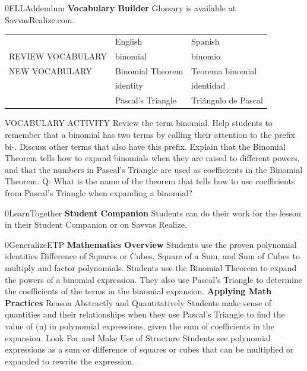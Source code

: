 \documentclass{article}
\newenvironment{te-addendum}[2]{}{}     %
\newcommand{\answer}[1]{}               %
\newcommand{\placeholder}[2]{}          %
\begin{document}
\begin{te-addendum}{0}{ELLAddendum}
\textbf{Vocabulary Builder}
Glossary is available at SavvasRealize.com.
\begin{tabular}{lll}
 & English & Spanish \\
REVIEW VOCABULARY & binomial & binomio \\
NEW VOCABULARY & Binomial Theorem & Teorema binomial \\
 & identity & identidad \\
 & Pascal's Triangle & Triángulo de Pascal \\
\end{tabular}
VOCABULARY ACTIVITY
Review the term binomial. Help students to remember that a binomial has two terms by calling their attention to the prefix bi-. Discuss other terms that also have this prefix.
Explain that the Binomial Theorem tells how to expand binomials when they are raised to different powers, and that the numbers in Pascal's Triangle are used as coefficients in the Binomial Theorem.
Q: What is the name of the theorem that tells how to use coefficients from Pascal's Triangle when expanding a binomial?
\answer{the Binomial Theorem}
\end{te-addendum}
\begin{te-addendum}{0}{LearnTogether}
\textbf{Student Companion}
Students can do their work for the lesson in their Student Companion or on Savvas Realize.
\placeholder{illustration}{Student Companion book cover, multicolored light rings around reflective spheres on a dark background; Student Companion, enVision Algebra 2, SAVVAS.}
\end{te-addendum}
\begin{te-addendum}{0}{GeneralizeETP}
\textbf{Mathematics Overview}
Students use the proven polynomial identities Difference of Squares or Cubes, Square of a Sum, and Sum of Cubes to multiply and factor polynomials.
Students use the Binomial Theorem to expand the powers of a binomial expression. They also use Pascal's Triangle to determine the coefficients of the terms in the binomial expansion.
\textbf{Applying Math Practices}
Reason Abstractly and Quantitatively
Students make sense of quantities and their relationships when they use Pascal's Triangle to find the value of (n) in polynomial expressions, given the sum of coefficients in the expansion.
Look For and Make Use of Structure
Students see polynomial expressions as a sum or difference of squares or cubes that can be multiplied or expanded to rewrite the expression.
\end{te-addendum}
\end{document}
